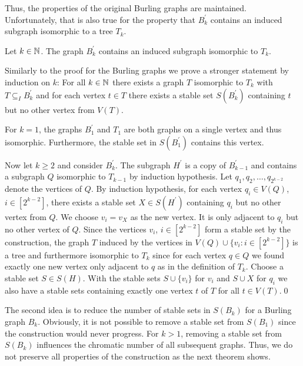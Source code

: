 Thus, the properties of the original Burling graphs are maintained. Unfortunately, that is also true for the property that $B_k^\prime$ contains an induced subgraph isomorphic to a tree $T_k$.

\begin{thm}
Let $k\in\mathbb{N}$. The graph $B_k^\prime$ contains an induced subgraph isomorphic to $T_k$.
\end{thm}
\begin{prf}
Similarly to the proof for the Burling graphs we prove a stronger statement by induction on $k$: For all $k\in\mathbb{N}$ there exists a graph $T$ isomorphic to $T_k$ with $T\subseteq_I B_k^\prime$ and for each vertex $t\in T$ there exists a stable set $S(B_k^\prime )$ containing $t$ but no other vertex from $V(T)$.

For $k=1$, the graphs $B_1^\prime$ and $T_1$ are both graphs on a single vertex and thus isomorphic. Furthermore, the stable set in $S(B_1^\prime)$ contains this vertex.

Now let $k\geq 2$ and consider $B_k^\prime$. The subgraph $H^\prime$ is a copy of $B_{k-1}^\prime$ and contains a subgraph $Q$ isomorphic to $T_{k-1}$ by induction hypothesis.  Let $q_1, q_2,\dots , q_{2^{k-2}}$ denote the vertices of $Q$. By induction hypothesis, for each vertex $q_i\in V(Q)$, $i\in [2^{k-2}]$, there exists a stable set $X\in S(H^\prime)$ containing $q_i$ but no other vertex from $Q$. We choose $v_i=v_X$ as the new vertex. It is only adjacent to $q_i$ but no other vertex of $Q$. Since the vertices $v_i$, $i\in [2^{k-2}]$ form a stable set by the construction, the graph $T$ induced by the vertices in $V(Q)\cup \{v_i:i\in [2^{k-2}]\}$ is a tree and furthermore isomorphic to $T_k$ since for each vertex $q\in Q$ we found exactly one new vertex only adjacent to $q$ as in the definition of $T_k$. Choose a stable set $S\in S(H)$. With the stable sets $S\cup \{v_i\}$ for $v_i$ and $S\cup X$ for $q_i$ we also have a stable sets containing exactly one vertex $t$ of $T$ for all $t\in V(T)$.\qed
\end{prf}

The second idea is to reduce the number of stable sets in $S(B_k)$ for a Burling graph $B_k$. Obviously, it is not possible to remove a stable set from $S(B_1)$ since the construction would never progress. For $k>1$, removing a stable set from $S(B_k)$ influences the chromatic number of all subsequent graphs. Thus, we do not preserve all properties of the construction as the next theorem shows.

